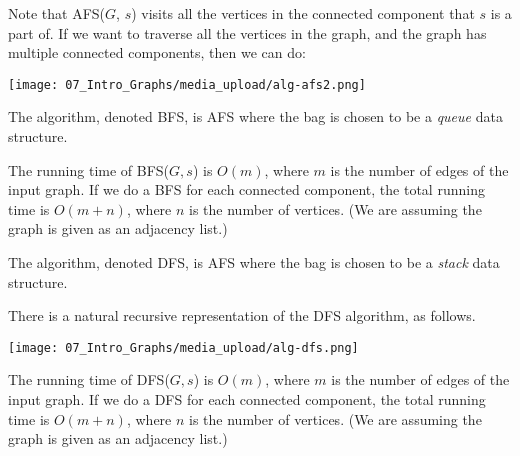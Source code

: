 \begin{note} \label{note:Traversing-all-the-vertices-in-the-graph}
Note that AFS($G$, $s$) visits all the vertices in the connected component that $s$ is a part of. If we want to traverse all the vertices in the graph, and the graph has multiple connected components, then we can do:
\begin{center}
    \texttt{[image: 07\_Intro\_Graphs/media\_upload/alg-afs2.png]}
\end{center}
\end{note}


\begin{definition} \label{definition:Breadth-first-search-BFS-algorithm} 
The  algorithm, denoted BFS, is AFS where the bag is chosen to be a \emph{queue} data structure. 
\end{definition}


\begin{note} \label{note:Running-time-of-BFS} 
The running time of BFS($G,s$) is $O(m)$, where $m$ is the number of edges of the input graph. If we do a BFS for each connected component, the total running time is $O(m+n)$, where $n$ is the number of vertices. (We are assuming the graph is given as an adjacency list.)
\end{note}


\begin{definition} \label{definition:Depth-first-search-DFS-algorithm} 
The  algorithm, denoted DFS, is AFS where the bag is chosen to be a \emph{stack} data structure. 
\end{definition}


\begin{note} \label{note:Recursive-DFS}
There is a natural recursive representation of the DFS algorithm, as follows.
\begin{center}
    \texttt{[image: 07\_Intro\_Graphs/media\_upload/alg-dfs.png]}
\end{center}
\end{note}


\begin{note} \label{note:Running-time-of-DFS}
The running time of DFS($G,s$) is $O(m)$, where $m$ is the number of edges of the input graph. If we do a DFS for each connected component, the total running time is $O(m+n)$, where $n$ is the number of vertices. (We are assuming the graph is given as an adjacency list.)
\end{note}


